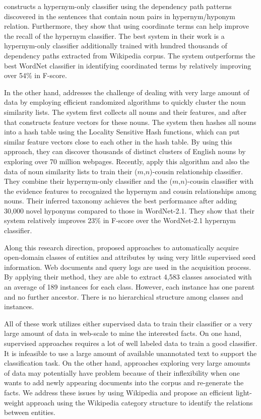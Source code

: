 \cite{ilprints665} constructs a hypernym-only classifier using the dependency path patterns discovered in the sentences that contain noun pairs in hypernym/hyponym relation.
Furthermore, they show that using coordinate terms can help improve the recall of the hypernym classifier.
The best system in their work is a hypernym-only classifier additionally trained with hundred thousands of dependency paths extracted from Wikipedia corpus.
The system outperforms the best WordNet classifier in identifying coordinated terms by relatively improving over 54\% in F-score.

In the other hand, \cite{citeulike:2915130} addresses the challenge of dealing with very large amount of data by employing efficient randomized algorithms to quickly cluster the noun similarity lists. The system first collects all nouns and their features, and after that constructs feature vectors for these nouns. The system then hashes all nouns into a hash table using the Locality Sensitive Hash functions, which can put similar feature vectors close to each other in the hash table. By using this approach, they can discover thousands of distinct clusters of English nouns by exploring over 70 million webpages. Recently, \cite{Snow2006} apply this algorithm and also the data of noun similarity lists to train their ($m$,$n$)-cousin relationship classifier. They combine their hypernym-only classifier and the ($m$,$n$)-cousin classifier with the evidence features to recognized the hypernym and cousin relationships among nouns. Their inferred taxonomy achieves the best performance after adding 30,000 novel hyponyms compared to those in WordNet-2.1. They show that their system relatively improves 23\% in F-score over the WordNet-2.1 hypernym classifier.

Along this research direction, \cite{citeulike:1587018,pacsca-vandurme:2008:ACLMain} proposed approaches to automatically acquire open-domain classes of entities and attributes by using very little supervised seed information. Web documents and query logs are used in the acquisition process. By applying their method, they are able to extract 4,583 classes associated with an average of 189 instances for each class. However, each instance has one parent and no further ancestor. There is no hierarchical structure among classes and instances.

All of these work utilizes either supervised data to train their classifier or a very large amount of data in web-scale to mine the interested facts. On one hand, supervised approaches requires a lot of well labeled data to train a good classifier. It is infeasible to use a large amount of available unannotated text to support the classification task. On the other hand, approaches exploring very large amounts of data may potentially have problem because of their inflexibility when one wants to add newly appearing documents into the corpus and re-generate the facts. We address these issues by using Wikipedia and propose an efficient light-weight approach using the Wikipedia category structure to identify the relations between entities. 